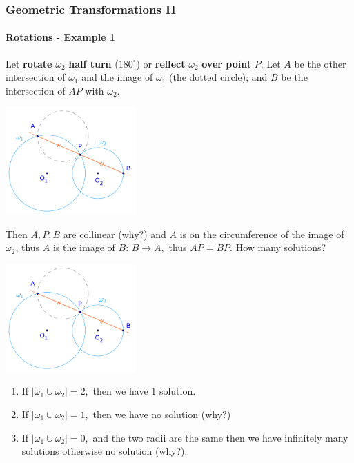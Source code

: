\documentclass[8pt,xcolor=table,dvipsnames]{beamer}
\newcommand{\dg}{^\circ}
\begin{document}
\begin{frame}[t]
    \frametitle{Geometric Transformations II}
    \framesubtitle{Rotations - Example 1}
    \begin{overprint}
        Let \textbf{rotate} $\omega_2$ \textbf{half turn} ($180\dg$) or \textbf{reflect} $\omega_2$ \textbf{over point} $P$.
        Let $A$ be the other intersection of $\omega_1$ and the image of $\omega_1$ (the dotted circle); and $B$ be the intersection of $AP$ with $\omega_2.$
        \begin{center}
            \includegraphics[width=5cm]{./svg/pdf/rotation-1b.pdf}
        \end{center}
        Then $A, P, B$ are collinear (why?) and $A$ is on the circumference of the image of $\omega_2$, thus $A$ is the image of $B$: $B \rightarrow A,$ thus $AP=BP.$
        How many solutions?
        \begin{center}
            \includegraphics[width=5cm]{./svg/pdf/rotation-1b.pdf}
        \end{center}
        \begin{enumerate}
            \item If $|\omega_1 \cup \omega_2| = 2,$ then we have 1 solution.
            \item If $|\omega_1 \cup \omega_2| = 1,$ then we have no solution (why?)
            \item If $|\omega_1 \cup \omega_2| = 0,$ and the two radii are the same then we have infinitely many solutions
            otherwise no solution (why?).
        \end{enumerate}
    \end{overprint}    
\end{frame}
\end{document}
